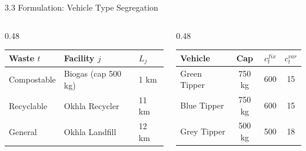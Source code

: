 \documentclass[aspectratio=169]{beamer}
\begin{document}
\begin{frame}{3.3 Formulation: Vehicle Type Segregation}
    \vspace{0.15cm}
    \normalsize
    \begin{columns}[T]
        \begin{column}{0.48\textwidth}
            \begin{table}
                \centering\footnotesize
                \begin{tabular}{l l l}
                    \toprule
                    \textbf{Waste $t$} & \textbf{Facility $j$} & \textbf{$L_j$} \\ \midrule
                    \rowcolor{green!15} Compostable & Biogas (cap 500 kg) & 1 km \\
                    \rowcolor{blue!10} Recyclable & Okhla Recycler & 11 km \\
                    \rowcolor{gray!15} General & Okhla Landfill & 12 km \\
                    \bottomrule
                \end{tabular}
            \end{table}
        \end{column}
        \begin{column}{0.48\textwidth}
            \begin{table}
                \centering\footnotesize
                \begin{tabular}{l c c c}
                    \toprule
                    \textbf{Vehicle} & \textbf{Cap} & $c^{fix}_t$ & $c^{var}_t$ \\ \midrule
                    \rowcolor{green!15} Green Tipper & 750 kg & 600 & 15 \\
                    \rowcolor{blue!10} Blue Tipper & 750 kg & 600 & 15 \\
                    \rowcolor{gray!15} Grey Tipper & 500 kg & 500 & 18 \\
                    \bottomrule
                \end{tabular}
            \end{table}
        \end{column}
    \end{columns}
\end{frame}
\end{document}
